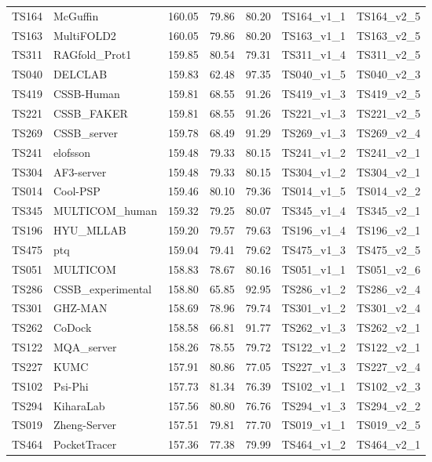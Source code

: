 \begin{longtable}{lllllll}
TS164 & McGuffin & 160.05 & 79.86 & 80.20 & TS164\_v1\_1 & TS164\_v2\_5 \\ 
TS163 & MultiFOLD2 & 160.05 & 79.86 & 80.20 & TS163\_v1\_1 & TS163\_v2\_5 \\ 
TS311 & RAGfold\_Prot1 & 159.85 & 80.54 & 79.31 & TS311\_v1\_4 & TS311\_v2\_5 \\ 
TS040 & DELCLAB & 159.83 & 62.48 & 97.35 & TS040\_v1\_5 & TS040\_v2\_3 \\ 
TS419 & CSSB-Human & 159.81 & 68.55 & 91.26 & TS419\_v1\_3 & TS419\_v2\_5 \\ 
TS221 & CSSB\_FAKER & 159.81 & 68.55 & 91.26 & TS221\_v1\_3 & TS221\_v2\_5 \\ 
TS269 & CSSB\_server & 159.78 & 68.49 & 91.29 & TS269\_v1\_3 & TS269\_v2\_4 \\ 
TS241 & elofsson & 159.48 & 79.33 & 80.15 & TS241\_v1\_2 & TS241\_v2\_1 \\ 
TS304 & AF3-server & 159.48 & 79.33 & 80.15 & TS304\_v1\_2 & TS304\_v2\_1 \\ 
TS014 & Cool-PSP & 159.46 & 80.10 & 79.36 & TS014\_v1\_5 & TS014\_v2\_2 \\ 
TS345 & MULTICOM\_human & 159.32 & 79.25 & 80.07 & TS345\_v1\_4 & TS345\_v2\_1 \\ 
TS196 & HYU\_MLLAB & 159.20 & 79.57 & 79.63 & TS196\_v1\_4 & TS196\_v2\_1 \\ 
TS475 & ptq & 159.04 & 79.41 & 79.62 & TS475\_v1\_3 & TS475\_v2\_5 \\ 
TS051 & MULTICOM & 158.83 & 78.67 & 80.16 & TS051\_v1\_1 & TS051\_v2\_6 \\ 
TS286 & CSSB\_experimental & 158.80 & 65.85 & 92.95 & TS286\_v1\_2 & TS286\_v2\_4 \\ 
TS301 & GHZ-MAN & 158.69 & 78.96 & 79.74 & TS301\_v1\_2 & TS301\_v2\_4 \\ 
TS262 & CoDock & 158.58 & 66.81 & 91.77 & TS262\_v1\_3 & TS262\_v2\_1 \\ 
TS122 & MQA\_server & 158.26 & 78.55 & 79.72 & TS122\_v1\_2 & TS122\_v2\_1 \\ 
TS227 & KUMC & 157.91 & 80.86 & 77.05 & TS227\_v1\_3 & TS227\_v2\_4 \\ 
TS102 & Psi-Phi & 157.73 & 81.34 & 76.39 & TS102\_v1\_1 & TS102\_v2\_3 \\ 
TS294 & KiharaLab & 157.56 & 80.80 & 76.76 & TS294\_v1\_3 & TS294\_v2\_2 \\ 
TS019 & Zheng-Server & 157.51 & 79.81 & 77.70 & TS019\_v1\_1 & TS019\_v2\_5 \\ 
TS464 & PocketTracer & 157.36 & 77.38 & 79.99 & TS464\_v1\_2 & TS464\_v2\_1 \\ 

\end{longtable}
